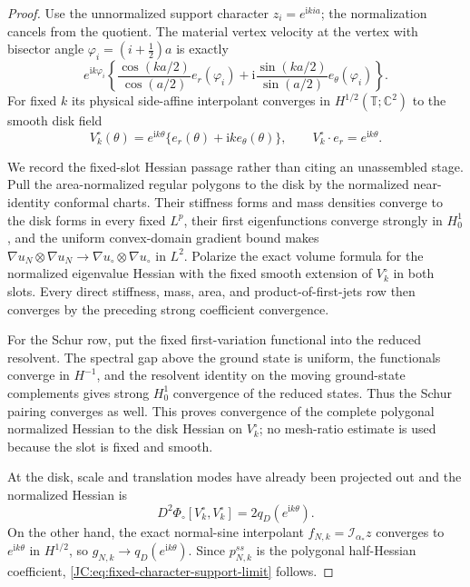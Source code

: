 \documentclass[11pt]{amsart}
\numberwithin{equation}{section}
\theoremstyle{definition}
\theoremstyle{remark}
\begin{document}
\begin{proof}
Use the unnormalized support character $z_i=e^{\mathrm i kia}$; the
normalization cancels from the quotient.  The material vertex velocity
at the vertex with bisector angle $\varphi_i=(i+\tfrac12)a$ is exactly
\[
 e^{\mathrm i k\varphi_i}\left\{
 \frac{\cos(ka/2)}{\cos(a/2)}e_r(\varphi_i)
 +\mathrm i\frac{\sin(ka/2)}{\sin(a/2)}
 e_\theta(\varphi_i)\right\}.
\]
For fixed $k$ its physical side-affine interpolant converges in
$H^{1/2}(\mathbb T;\mathbb C^2)$ to the smooth disk field
\[
 V_k^\circ(\theta)=e^{\mathrm i k\theta}
 \{e_r(\theta)+\mathrm i k e_\theta(\theta)\},
 \qquad V_k^\circ\cdot e_r=e^{\mathrm i k\theta}.
\]

We record the fixed-slot Hessian passage rather than citing an
unassembled stage.  Pull the area-normalized regular polygons to the
disk by the normalized near-identity conformal charts.  Their stiffness
forms and mass densities converge to the disk forms in every fixed
$L^p$, their first eigenfunctions converge strongly in $H_0^1$, and
the uniform convex-domain gradient bound makes
$\nabla u_N\otimes\nabla u_N\to
\nabla u_\circ\otimes\nabla u_\circ$ in $L^2$.
Polarize the exact volume formula for the normalized eigenvalue
Hessian with the fixed smooth extension of $V_k^\circ$ in both slots.
Every direct stiffness, mass, area, and product-of-first-jets row then
converges by the preceding strong coefficient convergence.

For the Schur row, put the fixed first-variation functional into the
reduced resolvent.  The spectral gap above the ground state is uniform,
the functionals converge in $H^{-1}$, and the resolvent identity on the
moving ground-state complements gives strong $H_0^1$ convergence of
the reduced states.  Thus the Schur pairing converges as well.  This
proves convergence of the complete polygonal normalized Hessian to the
disk Hessian on $V_k^\circ$; no mesh-ratio estimate is used because the
slot is fixed and smooth.

At the disk, scale and translation modes have already been projected
out and the normalized Hessian is
\[
 D^2\Phi_\circ[V_k^\circ,V_k^\circ]
 =2q_D(e^{\mathrm i k\theta}).
\]
On the other hand, the exact normal-sine interpolant
$f_{N,k}=\mathcal I_{\alpha_*}z$ converges to
$e^{\mathrm i k\theta}$ in $H^{1/2}$, so
$g_{N,k}\to q_D(e^{\mathrm i k\theta})$.
Since $p^{ss}_{N,k}$ is the polygonal half-Hessian coefficient,
\eqref{JC:eq:fixed-character-support-limit} follows.
\end{proof}
\end{document}
